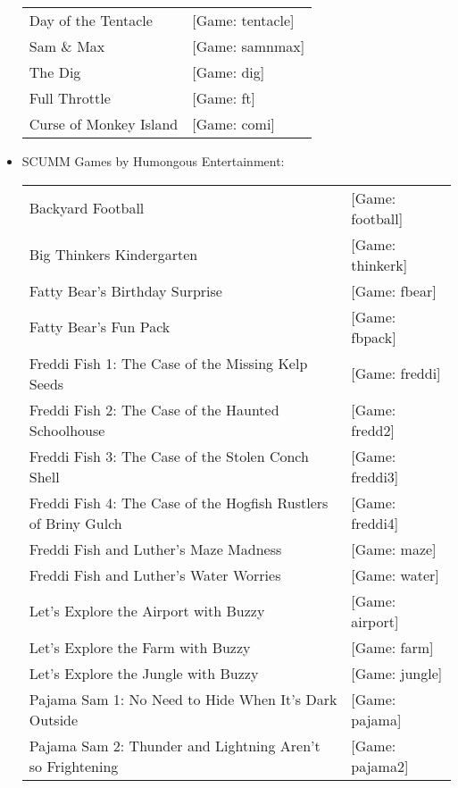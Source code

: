 \begin{itemize}
\begin {tabular} [h] {ll}
    Day of the Tentacle&                           [Game: tentacle]\\
    Sam \& Max&                                    [Game: samnmax]\\
    The Dig&                                       [Game: dig]\\
    Full Throttle&                                 [Game: ft]\\
    Curse of Monkey Island&                        [Game: comi]\\
  \end{tabular}
\item SCUMM Games by Humongous Entertainment:\\
  \begin{tabular}[h]{ll}
    Backyard Football&                                             [Game: football]\\
    Big Thinkers Kindergarten&                                     [Game: thinkerk]\\
    Fatty Bear's Birthday Surprise&                                [Game: fbear]\\
    Fatty Bear's Fun Pack&                                         [Game: fbpack]\\
    Freddi Fish 1: The Case of the Missing Kelp Seeds&             [Game: freddi]\\
    Freddi Fish 2: The Case of the Haunted Schoolhouse&            [Game: fredd2]\\
    Freddi Fish 3: The Case of the Stolen Conch Shell&             [Game: freddi3]\\
    Freddi Fish 4: The Case of the Hogfish Rustlers of Briny Gulch&[Game: freddi4]\\
    Freddi Fish and Luther's Maze Madness&                         [Game: maze]\\
    Freddi Fish and Luther's Water Worries&                        [Game: water]\\
    Let's Explore the Airport with Buzzy&                          [Game: airport]\\
    Let's Explore the Farm with Buzzy&                             [Game: farm]\\
    Let's Explore the Jungle with Buzzy&                           [Game: jungle]\\
    Pajama Sam 1: No Need to Hide When It's Dark Outside&          [Game: pajama]\\
    Pajama Sam 2: Thunder and Lightning Aren't so Frightening&     [Game: pajama2]\\

\end{tabular}
\end{itemize}
